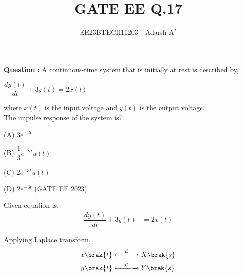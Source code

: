 \documentclass[journal,12pt,onecolumn]{IEEEtran}
\theoremstyle{remark}
\begin{document}
	
	
	\vspace{3cm}
	
	\title{GATE EE Q.17}
	\author{EE23BTECH11203 - Adarsh A$^{*}$%
	}
	\maketitle
	\bigskip
	
	\renewcommand{\thefigure}{\theenumi}
	\renewcommand{\thetable}{\theenumi}
	
	
	\vspace{0.2cm}
	\linespread{1.1}
	
	
	\textbf{\fontsize{14}{20}\selectfont Question : }
	\fontsize{14}{20}\selectfont A continuous-time system that is initially at rest is described by,
	\begin{center}
		$\dfrac{dy(t)}{dt} + 3y(t) = 2x(t)$
	\end{center}
	where $x(t)$ is the input voltage and $y(t)$ is the output voltage.\\ 
	The impulse response of the system is?
	
	\vspace{0.2cm}
	
	(A) 3$e^{-2t}$
	
	\vspace{0.3cm}
	
	(B) $\dfrac{1}{3}e^{-2t} u(t)$
	
	\vspace{0.3cm}
	
	(C) 2$e^{-3t} u(t)$
	
	\vspace{0.2cm}
	
	(D) 2$e^{-3t}$ \hfill{(GATE EE 2023)}
	
	\vspace{0.2cm}
 	
	\solution
	
	
	
	
	Given equation is,
	\begin{align}
		\dfrac{dy(t)}{dt} + 3y(t) &= 2x(t)
	\end{align}
	
	Applying Laplace transform,
	\begin{align}
		x\brak{t} &
		\xleftarrow[]{\hspace{0.4cm}{\mathcal{L}}\hspace{0.1cm}}\xrightarrow[]{}
		X\brak{s}\\
		y\brak{t} &
		\xleftarrow[]{\hspace{0.4cm}{\mathcal{L}}\hspace{0.1cm}}\xrightarrow[]{}
		Y\brak{s}
	\end{align}
\end{document}
